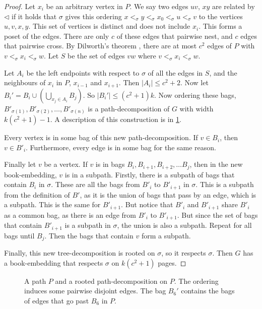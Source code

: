 \begin{proof}
    Let $x_i$ be an arbitrary vertex in $P$. We say two edges $uv$, $xy$ are related by $\lhd$ if it holds that $\sigma$ gives this ordering $x <_\sigma y <_\sigma x_0 <_\sigma u <_\sigma v$ to the vertices $u,v, x, y$. This set of vertices is distinct and does not include $x_i$. This forms a poset of the edges. There are only $c$ of these edges that pairwise nest, and $c$ edges that pairwise cross. By Dilworth's theorem \cite{dilworthDecompositionTheoremPartially1950}, there are at most $c^2$ edges of $P$ with $v <_\sigma x_i <_\sigma w$. Let $S$ be the set of edges $vw$ where $v <_\sigma x_i <_\sigma w$.

    Let $A_i$ be the left endpoints with respect to $\sigma$ of all the edges in $S$, and the neighbours of $x_i$ in $P$, $x_{i-1}$ and $x_{i + 1}$. Then $|A_i| \leq c^2 + 2$. Now let $B_i' = B_i \cup \left(\bigcup_{x_j \in A_i} B_j\right)$. So $|B_i'| \leq (c^2 + 1) k$. Now ordering these bags, $B'_{\sigma(1)}, B'_{\sigma(2)}, \ldots, B'_{\sigma(n)}$ is a path-decomposition of $G$ with width $k (c^2 + 1)- 1$. A description of this construction is in \cref{fig:pairwise_disjoint}.
    
    Every vertex is in some bag of this new path-decomposition. If $v \in B_i$, then $v \in B'_{i}$. Furthermore, every edge is in some bag for the same reason.

    Finally let $v$ be a vertex. If $v$ is in bags $B_{i},  B_{i + 1}, B_{i + 2}, \ldots B_j$, then in the new book-embedding, $v$ is in a subpath. Firstly, there is a subpath of bags that contain $B_i$ in $\sigma$. These are all the bags from $B'_{i}$ to $B'_{i + 1}$ in $\sigma$. This is a subpath from the definition of $B'$, as it is the union of bags that pass by an edge, which is a subpath. This is the same for $B'_{i + 1}$. But notice that $B'_i$ and $B'_{i + 1}$ share $B'_i$ as a common bag, as there is an edge from $B'_{i}$ to $B'_{i + 1}$. But since the set of bags that contain $B'_{i + 1}$ is a subpath in $\sigma$, the union is also a subpath. Repeat for all bags until $B_j$. Then the bags that contain $v$ form a subpath.

    Finally, this new tree-decomposition is rooted on $\sigma$, so it respects $\sigma$. Then $G$ has a book-embedding that respects $\sigma$ on $k(c^2 + 1)$ pages. 
\end{proof}

\begin{figure}[h!]
    \centering
    
    \caption[Bag concatenation for pairwise disjoint edges]{A path $P$ and a rooted path-decomposition on $P$. The ordering induces some pairwise disjoint edges. The bag $B_6'$ contains the bags of edges that go past $B_6$ in $P$.}\label{fig:pairwise_disjoint}
\end{figure}

